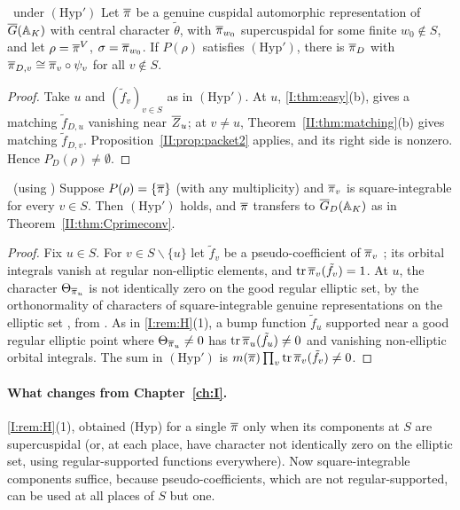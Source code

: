 \begin{theorem}[Converse]\label{II:thm:Cprimeconv}\ under $(\mathrm{Hyp}')$
Let $\overline{\pi}$ be a genuine cuspidal automorphic representation of $\overline{G}(\mathbb{A}_K)$ with central character $\tilde\theta$, with $\overline{\pi}_{w_0}$ supercuspidal for some finite $w_0\notin S$, and let $\rho=\overline{\pi}^V$, $\sigma=\overline{\pi}_{w_0}$. If $P(\rho)$ satisfies $(\mathrm{Hyp}')$, there is $\overline{\pi}_D$ with $\overline{\pi}_{D,v}\cong\overline{\pi}_v\circ\psi_v$ for all $v\notin S$.
\end{theorem}
\begin{proof}
Take $u$ and $(\tilde f_v)_{v\in S}$ as in $(\mathrm{Hyp}')$. At $u$, \cref{I:thm:easy}(b), gives a matching $\tilde f_{D,u}$ vanishing near $\overline{Z}_u$; at $v\ne u$, Theorem~\ref{II:thm:matching}(b) gives matching $\tilde f_{D,v}$. Proposition~\ref{II:prop:packet2} applies, and its right side is nonzero. Hence $P_D(\rho)\ne\emptyset$.
\end{proof}

\begin{corollary}\label{II:cor:Hprimesq}\ (using \Ev)
Suppose $P(\rho)=\{\overline{\pi}\}$ (with any multiplicity) and $\overline{\pi}_v$ is square-integrable for every $v\in S$. Then $(\mathrm{Hyp}')$ holds, and $\overline{\pi}$ transfers to $\overline{G}_D(\mathbb{A}_K)$ as in Theorem~\ref{II:thm:Cprimeconv}.
\end{corollary}
\begin{proof}
Fix $u\in S$. For $v\in S\smallsetminus\{u\}$ let $\tilde f_v$ be a pseudo-coefficient of $\overline{\pi}_v$ \cite[\S25.1, Theorem]{FK86} \Ev; its orbital integrals vanish at regular non-elliptic elements, and $\operatorname{tr}\overline{\pi}_v(\tilde f_v)=1$. At $u$, the character $\Theta_{\overline{\pi}_u}$ is not identically zero on the good regular elliptic set, by the orthonormality of characters of square-integrable genuine representations on the elliptic set \cite[\S25]{FK86}, from \cite[Theorem~K]{Kaz86} \Ev. As in \cref{I:rem:H}(1), a bump function $\tilde f_u$ supported near a good regular elliptic point where $\Theta_{\overline{\pi}_u}\ne0$ has $\operatorname{tr}\overline{\pi}_u(\tilde f_u)\ne0$ and vanishing non-elliptic orbital integrals. The sum in $(\mathrm{Hyp}')$ is $m(\overline{\pi})\prod_v\operatorname{tr}\overline{\pi}_v(\tilde f_v)\ne0$.
\end{proof}

\paragraph{What changes from Chapter~\ref{ch:I}.} \cref{I:rem:H}(1), obtained (Hyp) for a single $\overline{\pi}$ only when its components at $S$ are supercuspidal (or, at each place, have character not identically zero on the elliptic set, using regular-supported functions everywhere). Now square-integrable components suffice, because pseudo-coefficients, which are not regular-supported, can be used at all places of $S$ but one.

